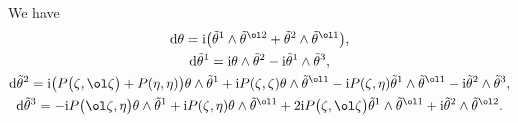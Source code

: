 \begin{Proposition} We have
\begin{gather}
{\rm d}\theta={\rm i}\bigl(\tilde\theta^1\wedge\tilde\theta^{\ol2}+\tilde\theta^2\wedge\tilde\theta^{\ol1}\bigr), \nonumber\\
{\rm d}\tilde\theta^1={\rm i}\theta\wedge\tilde\theta^2-{\rm i}\tilde\theta^1\wedge\tilde\theta^3, \nonumber\\
{\rm d}\tilde\theta^2={\rm i}\bigl(P\bigl(\zeta, \ol\zeta\bigr)+P(\eta, \eta)\bigr)\theta\wedge\tilde\theta^1+{\rm i}P(\zeta, \zeta)\theta\wedge\tilde\theta^{\ol1}
- {\rm i}P(\zeta, \eta)\tilde\theta^1\wedge\tilde\theta^{\ol1}-{\rm i}\tilde\theta^2\wedge\tilde\theta^3, \nonumber\\
{\rm d}\tilde\theta^3=- {\rm i}P\bigl(\ol\zeta, \eta\bigr)\theta\wedge\tilde\theta^1+{\rm i}
P(\zeta, \eta)\theta\wedge\tilde\theta^{\ol1}
+ 2{\rm i}P\bigl(\zeta, \ol\zeta\bigr)\tilde\theta^1\wedge\tilde\theta^{\ol1}+{\rm i}\tilde\theta^2\wedge\tilde\theta^{\ol2}.\label{diff-coframe}
\end{gather}
\end{Proposition}
